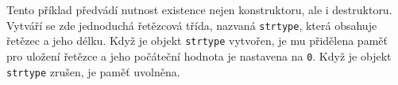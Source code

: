 \begin{mdframed}[style=mdexam]
  \begin{example}\label{cpp:exam013}
    Tento příklad předvádí nutnost existence nejen konstruktoru, ale i destruktoru. Vytváří se zde
    jednoduchá řetězcová třída, nazvaná \lstinline[style=luaCPPText]!strtype!, která obsahuje
    řetězec a jeho délku. Když je objekt \lstinline[style=luaCPPText]!strtype! vytvořen, je mu
    přidělena paměť pro uložení řetězce a jeho počáteční hodnota je nastavena na
    \lstinline[style=luaCPPText]!0!. Když je objekt \lstinline[style=luaCPPText]!strtype! zrušen, je
    paměť uvolněna.
    
  \end{example}
\end{mdframed}